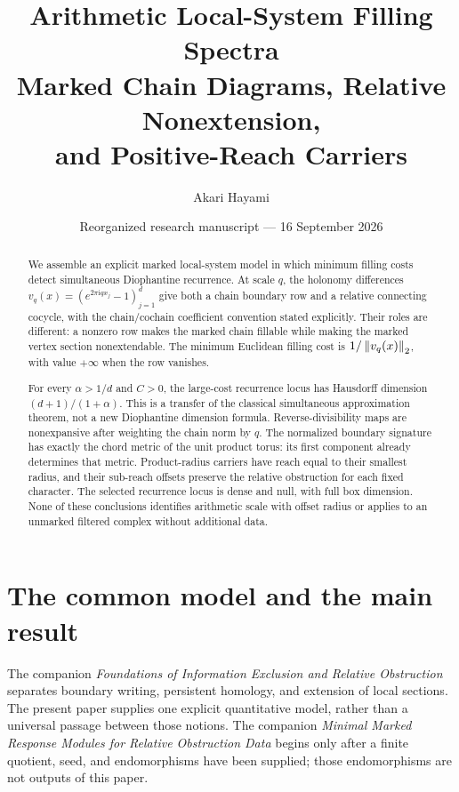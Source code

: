 \documentclass[11pt,a4paper]{article}
\title{\textbf{Arithmetic Local-System Filling Spectra}\\
\large Marked Chain Diagrams, Relative Nonextension,\\
and Positive-Reach Carriers}
\author{Akari Hayami}
\date{Reorganized research manuscript --- 16 September 2026}
\begin{document}
\maketitle

\begin{abstract}
We assemble an explicit marked local-system model in which minimum filling
costs detect simultaneous Diophantine recurrence.  At scale $q$, the
holonomy differences $v_q(x)=(e^{2\pi\mathrm i qx_j}-1)_{j=1}^d$ give
both a chain boundary row and a relative connecting cocycle, with the
chain/cochain coefficient convention stated explicitly.  Their roles are
different: a nonzero row makes the marked chain fillable while making the
marked vertex section nonextendable.  The minimum Euclidean filling cost
is $1/\left\lVert v_q(x)\right\rVert_2$, with value $+\infty$ when the row vanishes.

For every $\alpha>1/d$ and $C>0$, the large-cost recurrence locus has
Hausdorff dimension $(d+1)/(1+\alpha)$.  This is a transfer of the classical
simultaneous approximation theorem, not a new Diophantine dimension
formula.  Reverse-divisibility maps are nonexpansive after weighting the
chain norm by $q$.  The normalized boundary signature has exactly the
chord metric of the unit product torus: its first component already
determines that metric.  Product-radius carriers have reach equal to their
smallest radius, and their sub-reach offsets preserve the relative
obstruction for each fixed character.  The selected recurrence locus is
dense and null, with full box dimension.  None of these conclusions
identifies arithmetic scale with offset radius or applies to an unmarked
filtered complex without additional data.
\end{abstract}

\tableofcontents
\clearpage

\section{The common model and the main result}
\label{sec:overview}

The companion \emph{Foundations of Information Exclusion and Relative
Obstruction} separates boundary writing, persistent homology, and extension
of local sections.  The present paper supplies one explicit quantitative
model, rather than a universal passage between those notions.  The
companion \emph{Minimal Marked Response Modules for Relative Obstruction
Data} begins only after a finite quotient, seed, and endomorphisms have
been supplied; those endomorphisms are not outputs of this paper.
\end{document}
